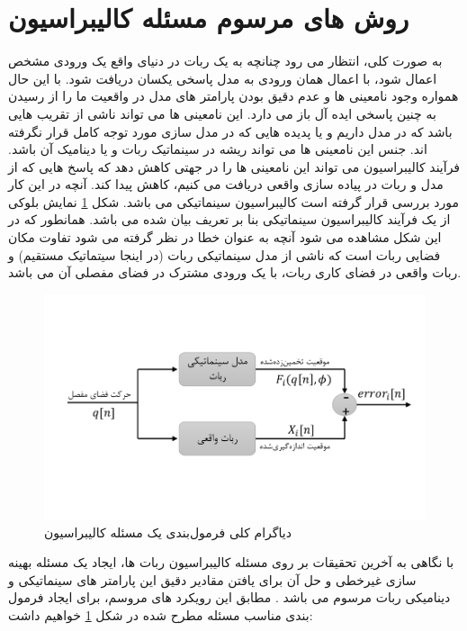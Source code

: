 \section{روش های مرسوم مسئله کالیبراسیون} \label{seq:conventional_calibration}
به صورت کلی، انتظار می رود چنانچه به یک ربات در دنیای واقع یک ورودی مشخص اعمال شود، با اعمال همان ورودی به مدل پاسخی یکسان دریافت شود. با این حال همواره وجود نامعینی ها و عدم دقیق بودن پارامتر های مدل در واقعیت ما را از رسیدن به چنین پاسخی ایده آل باز می دارد. این نامعینی ها می تواند ناشی از تقریب هایی باشد که در مدل داریم و یا پدیده هایی که در مدل سازی مورد توجه کامل قرار نگرفته اند. جنس این نامعینی ها می تواند ریشه در سینماتیک ربات و یا دینامیک آن باشد. فرآیند کالیبراسیون می تواند این نامعینی ها را در جهتی کاهش دهد که پاسخ هایی که از مدل و ربات در پیاده سازی واقعی دریافت می کنیم، کاهش پیدا کند. آنچه در این کار مورد بررسی قرار گرفته است کالیبراسیون سینماتیکی می باشد. شکل \ref{fig:kinematicmodelerror} نمایش بلوکی از یک فرآیند کالیبراسیون سینماتیکی بنا بر تعریف بیان شده می باشد. همانطور که در این شکل مشاهده می شود آنچه به عنوان خطا در نظر گرفته می شود تفاوت مکان فضایی ربات است که ناشی از مدل سینماتیکی ربات (در اینجا سیتماتیک مستقیم) و ربات واقعی در فضای کاری ربات، با یک ورودی مشترک در فضای مفصلی آن می باشد. 

\begin{figure}[!t]
	\centering
	\includegraphics[width=0.8\linewidth, trim={0cm 2.2cm 0cm 2.2cm}, clip]{img/kinematic_model_error}
	\caption{دیاگرام کلی فرمول‌بندی یک مسئله کالیبراسیون}
	\label{fig:kinematicmodelerror}
\end{figure}


با نگاهی به آخرین تحقیقات بر روی مسئله کالیبراسیون ربات ها، ایجاد یک مسئله بهینه سازی غیرخطی و حل آن برای یافتن مقادیر دقیق این پارامتر های سینماتیکی و دینامیکی ربات مرسوم می باشد
\cite{elatta2004overview,ida2019automatic,ida2022identification,ida2021dynamics}.
مطابق این رویکرد های مروسم، برای ایجاد فرمول بندی مناسب مسئله مطرح شده در شکل \ref{fig:kinematicmodelerror} خواهیم داشت:

